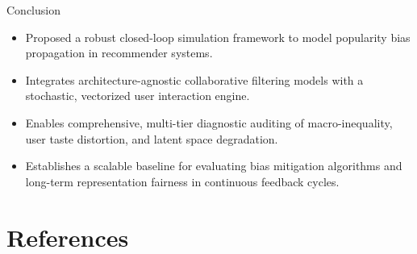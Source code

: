 \documentclass[11pt,aspectratio=43,xcolor=table]{beamer}
\begin{document}
\begin{frame}{Conclusion}
    \begin{itemize}
        \item Proposed a robust closed-loop simulation framework to model popularity bias propagation in recommender systems.
        \item Integrates architecture-agnostic collaborative filtering models with a stochastic, vectorized user interaction engine.
        \item Enables comprehensive, multi-tier diagnostic auditing of macro-inequality, user taste distortion, and latent space degradation.
        \item Establishes a scalable baseline for evaluating bias mitigation algorithms and long-term representation fairness in continuous feedback cycles.
    \end{itemize}
\end{frame}

\section{References}
\end{document}
